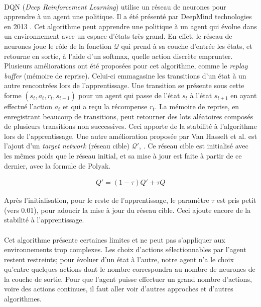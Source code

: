 \documentclass[letterpaper, french]{article}
\begin{document}
\paragraph{}
DQN (\textit{Deep Reinforcement Learning}) utilise un réseau de neurones pour apprendre à un agent une politique. Il a été présenté par DeepMind technologies en 2013 \cite{mnih2013playing}. Cet algorithme peut apprendre une politique à un agent qui évolue dans un environnement avec un espace d'états très grand. En effet, le réseau de neurones joue le rôle de la fonction $\mathcal{Q}$ qui prend à sa couche d'entrée les états, et retourne en sortie, à l'aide d'un softmax, quelle action discrète emprunter. Plusieurs améliorations ont été proposées pour cet algorithme, comme le \textit{replay buffer} (mémoire de reprise). Celui-ci emmagasine les transitions d'un état à un autre rencontrées lors de l'apprentissage. Une transition se présente sous cette forme $(s_t, a_t, r_t, s_{t+1})$ pour un agent qui passe de l'état $s_t$ à l'état $s_{t+1}$ en ayant effectué l'action $a_t$ et qui a reçu la récompense $r_t$. La mémoire de reprise, en enregistrant beaucoup de transitions, peut retourner des lots aléatoires composés de plusieurs transitions non successives. Ceci apporte de la stabilité à l'algorithme lors de l'apprentissage. Une autre amélioration proposée par Van Hasselt et al. est l'ajout d'un \textit{target network} (réseau cible) $\mathcal{Q\prime}$, \cite{wang2015dueling} \cite{wang2015dueling}. Ce réseau cible est initialisé avec les mêmes poids que le réseau initial, et sa mise à jour est faite à partir de ce dernier, avec la formule de Polyak.
\begingroup
\begin{center}
\begin{equation}\label{eq:q_update}
\begin{split}
 Q\prime = (1-\tau) Q\prime + \tau Q
\end{split}
\end{equation}
\end{center}
\endgroup
Après l'initialisation, pour le reste de l'apprentissage, le paramètre $\tau$ est pris petit (vers 0.01), pour adoucir la mise à jour du réseau cible. Ceci ajoute encore de la stabilité à l'apprentissage.
\paragraph{}
Cet algorithme présente certaines limites et ne peut pas s'appliquer aux environnements trop complexes. Les choix d'actions sélectionnables par l'agent restent restreints; pour évoluer d'un état à l'autre, notre agent n'a le choix qu'entre quelques actions dont le nombre correspondra au nombre de neurones de la couche de sortie. Pour que l'agent puisse effectuer un grand nombre d'actions, voire des actions continues, il faut aller voir d'autres approches et d'autres algorithmes.
\end{document}
